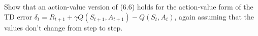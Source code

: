 
\begin{exercise}[Exercise 6.8]

Show that an action-value version of (6.6) holds for the action-value form
of the TD error $\delta_t = R_{t+1} + \gamma Q(S_{t+1}, A_{t+1}) - Q(S_t,A_t)$,
again assuming that the values don't change from step to step.

\end{exercise}


\begin{solution}

\phantom{}

\end{solution}

    